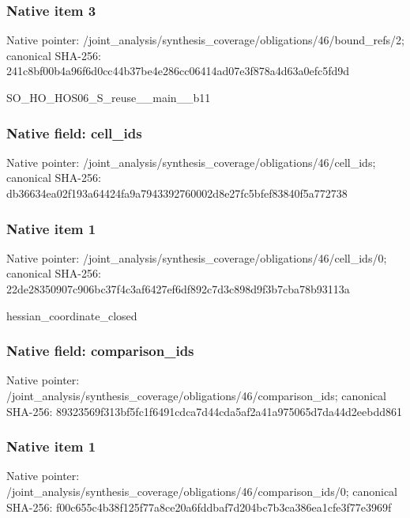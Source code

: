 \documentclass[10pt,a4paper]{article}
\begin{document}
\subsubsection{Native item 3}
Native pointer: /joint\_\allowbreak{}analysis/synthesis\_\allowbreak{}coverage/obligations/46/bound\_\allowbreak{}refs/2; canonical SHA-256: 241c8bf00b4a96f6d0cc44b37be4e286cc06414ad07e3f878a4d63a0efc5fd9d

\begingroup\raggedright\sloppy SO\_\allowbreak{}HO\_\allowbreak{}HOS06\_\allowbreak{}S\_\allowbreak{}reuse\_\allowbreak{}\_\allowbreak{}main\_\allowbreak{}\_\allowbreak{}b11\par\endgroup

\subsubsection{Native field: cell\_\allowbreak{}ids}
Native pointer: /joint\_\allowbreak{}analysis/synthesis\_\allowbreak{}coverage/obligations/46/cell\_\allowbreak{}ids; canonical SHA-256: db36634ea02f193a64424fa9a7943392760002d8e27fc5bfef83840f5a772738

\subsubsection{Native item 1}
Native pointer: /joint\_\allowbreak{}analysis/synthesis\_\allowbreak{}coverage/obligations/46/cell\_\allowbreak{}ids/0; canonical SHA-256: 22de28350907c906bc37f4c3af6427ef6df892c7d3c898d9f3b7cba78b93113a

\begingroup\raggedright\sloppy hessian\_\allowbreak{}coordinate\_\allowbreak{}closed\par\endgroup

\subsubsection{Native field: comparison\_\allowbreak{}ids}
Native pointer: /joint\_\allowbreak{}analysis/synthesis\_\allowbreak{}coverage/obligations/46/comparison\_\allowbreak{}ids; canonical SHA-256: 89323569f313bf5fc1f6491cdca7d44cda5af2a41a975065d7da44d2eebdd861

\subsubsection{Native item 1}
Native pointer: /joint\_\allowbreak{}analysis/synthesis\_\allowbreak{}coverage/obligations/46/comparison\_\allowbreak{}ids/0; canonical SHA-256: f00c655c4b38f125f77a8ce20a6fddbaf7d204bc7b3ca386ea1cfe3f77e3969f
\end{document}
